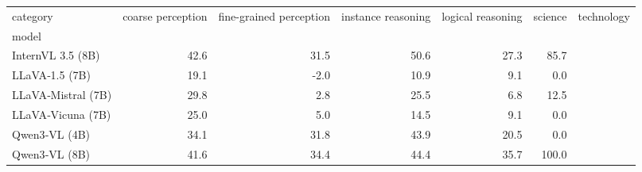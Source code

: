 \begin{tabular}{lrrrrr}
\toprule
category & coarse perception & fine-grained perception & instance reasoning & logical reasoning & science & technology \\
model &  &  &  &  &  \\
\midrule
InternVL 3.5 (8B) & 42.6 & 31.5 & 50.6 & 27.3 & 85.7 \\
LLaVA‑1.5 (7B) & 19.1 & -2.0 & 10.9 & 9.1 & 0.0 \\
LLaVA‑Mistral (7B) & 29.8 & 2.8 & 25.5 & 6.8 & 12.5 \\
LLaVA‑Vicuna (7B) & 25.0 & 5.0 & 14.5 & 9.1 & 0.0 \\
Qwen3‑VL (4B) & 34.1 & 31.8 & 43.9 & 20.5 & 0.0 \\
Qwen3‑VL (8B) & 41.6 & 34.4 & 44.4 & 35.7 & 100.0 \\
\bottomrule
\end{tabular}
